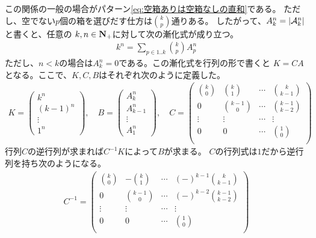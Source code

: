 	この関係の一般の場合がパターン\eqref{eq:空箱ありは空箱なしの直和}である。
	ただし、空でない$p$個の箱を選びだす仕方は$\binom{k}{p}$通りある。
	したがって、$A_k^n=\left|{{\mathcal{A}}_k^n}\right|$と書くと、任意の
	$k,n\in{\mathbf{N}}_+$に対して次の漸化式が成り立つ。
	\begin{equation}\label{eq:空箱ありの仕方の数は空箱なし仕方の数の和}\begin{split} %
		k^n = \sum_{p\in1..k}\binom{k}{p}A_p^n
	\end{split}\end{equation} %
	ただし、$n<k$の場合は$A_k^n=0$である。この漸化式を行列の形で書くと
	$K = CA$となる。ここで、$K,C,B$はそれぞれ次のように定義した。
	\begin{equation*}\begin{split} %
		K = \begin{pmatrix}
			k^n \\ (k-1)^n \\ \vdots \\ 1^n
		\end{pmatrix} 
		,\quad B = \begin{pmatrix}
			A_k^n \\ A_{k-1}^n \\ \vdots \\ A_1^n
		\end{pmatrix}
		,\quad C = \begin{pmatrix}
			\binom{k}{0} & \binom{k}{1} & \cdots & \binom{k}{k-1} \\
			0 & \binom{k-1}{0} & \cdots & \binom{k-1}{k-2} \\
			\vdots & \vdots & \cdots & \vdots \\
			0 & 0 & \cdots & \binom{1}{0} \\
		\end{pmatrix} 
	\end{split}\end{equation*} %
	行列$C$の逆行列が求まれば$C^{-1}K$によって$B$が求まる。
	$C$の行列式は$1$だから逆行列を持ち次のようになる。
	\begin{equation*}\begin{split} %
		C^{-1} = \begin{pmatrix}
			\binom{k}{0} & -\binom{k}{1} & \cdots & (-)^{k-1}\binom{k}{k-1} \\
			0 & \binom{k-1}{0} & \cdots & (-)^{k-2}\binom{k-1}{k-2} \\
			\vdots & \vdots & \cdots & \vdots \\
			0 & 0 & \cdots & \binom{1}{0} \\
		\end{pmatrix}
	\end{split}\end{equation*} %
